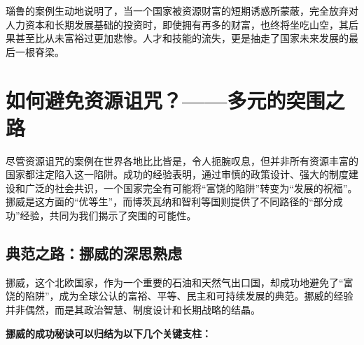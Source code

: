 瑙鲁的案例生动地说明了，当一个国家被资源财富的短期诱惑所蒙蔽，完全放弃对人力资本和长期发展基础的投资时，即使拥有再多的财富，也终将坐吃山空，其后果甚至比从未富裕过更加悲惨。人才和技能的流失，更是抽走了国家未来发展的最后一根脊梁。

\section{如何避免资源诅咒？——多元的突围之路}

尽管资源诅咒的案例在世界各地比比皆是，令人扼腕叹息，但并非所有资源丰富的国家都注定陷入这一陷阱。成功的经验表明，通过审慎的政策设计、强大的制度建设和广泛的社会共识，一个国家完全有可能将“富饶的陷阱”转变为“发展的祝福”。挪威是这方面的“优等生”，而博茨瓦纳和智利等国则提供了不同路径的“部分成功”经验，共同为我们揭示了突围的可能性。

\subsection{典范之路：挪威的深思熟虑}

挪威，这个北欧国家，作为一个重要的石油和天然气出口国，却成功地避免了“富饶的陷阱”，成为全球公认的富裕、平等、民主和可持续发展的典范。挪威的经验并非偶然，而是其政治智慧、制度设计和长期战略的结晶。

\textbf{挪威的成功秘诀可以归结为以下几个关键支柱：}

